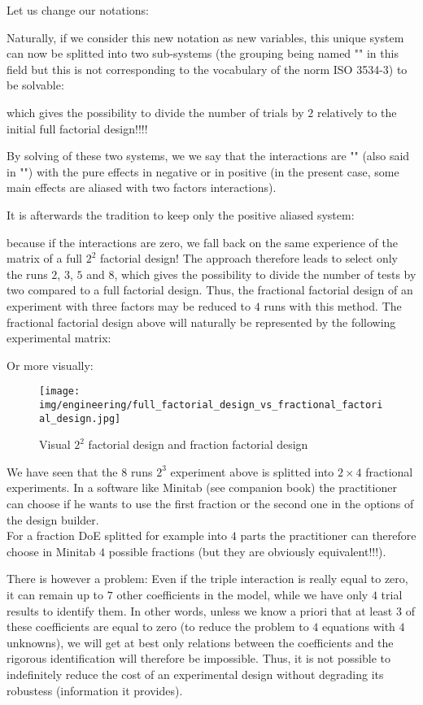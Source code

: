	Let us change our notations:
	
	Naturally, if we consider this new notation as new variables, this unique system can now be splitted into two sub-systems (the grouping being named "" in this field but this is not corresponding to the vocabulary of the norm ISO 3534-3) to be solvable:
	
	which gives the possibility to divide the number of trials by $2$ relatively to the initial full factorial design!!!! 

	By solving of these two systems, we we say that the interactions are "" (also said in "") with the pure effects in negative or in positive (in the present case, some main effects are aliased with two factors interactions).
	
	It is afterwards the tradition to keep only the positive aliased system:
	
	because if the interactions are zero, we fall back on the same experience of the matrix of a full $2^2$ factorial design! The approach therefore leads to select only the runs $2$, $3$, $5$ and $8$, which gives the possibility to divide the number of tests by two compared to a full factorial design. Thus, the fractional factorial design of an experiment with three factors may be reduced to $4$ runs with this method. The fractional factorial design above will naturally be represented by the following experimental matrix:
	
	
	Or more visually:
	\begin{figure}[H]
		\begin{center}
		\texttt{[image: img/engineering/full\_factorial\_design\_vs\_fractional\_factorial\_design.jpg]}
		\end{center}	
		\caption{Visual $2^2$ factorial design and fraction factorial design}
	\end{figure}
	\begin{tcolorbox}[title=Remark,colframe=black,arc=10pt]
	We have seen that the $8$ runs $2^3$ experiment above is splitted into $2\times 4$ fractional experiments. In a software like Minitab (see companion book) the practitioner can choose if he wants to use the first fraction or the second one in the options of the design builder.\\ 
	
	For a fraction DoE splitted for example into $4$ parts the practitioner can therefore choose in Minitab $4$ possible fractions (but they are obviously equivalent!!!).
	\end{tcolorbox}
	There is however a problem: Even if the triple interaction is really equal to zero, it can remain up to $7$ other coefficients in the model, while we have only $4$ trial results to identify them. In other words, unless we know a priori that at least $3$ of these coefficients are equal to zero (to reduce the problem to $4$ equations with $4$ unknowns), we will get at best only relations between the coefficients and the rigorous identification will therefore be impossible. Thus, it is not possible to indefinitely reduce the cost of an experimental design without degrading its robustess (information it provides).
	
